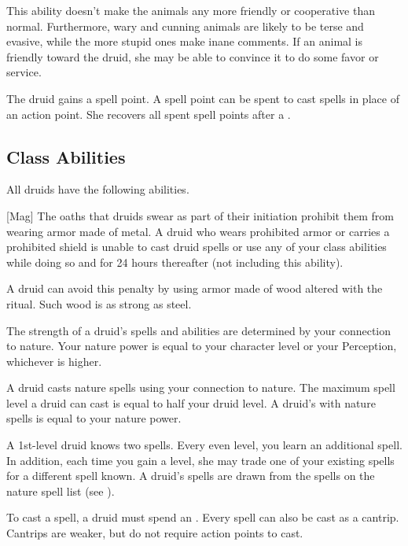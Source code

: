         This ability doesn't make the animals any more friendly or cooperative than normal.
        Furthermore, wary and cunning animals are likely to be terse and evasive, while the more stupid ones make inane comments.
        If an animal is friendly toward the druid, she may be able to convince it to do some favor or service.

        The druid gains a spell point.
        A spell point can be spent to cast spells in place of an action point.
        She recovers all spent spell points after a .

    \subsection{Class Abilities}
        All druids have the following abilities.

        [Mag]
        The oaths that druids swear as part of their initiation prohibit them from wearing armor made of metal.
        A druid who wears prohibited armor or carries a prohibited shield is unable to cast druid spells or use any of your  class abilities while doing so and for 24 hours thereafter (not including this ability).
        
        A druid can avoid this penalty by using armor made of wood altered with the  ritual.
        Such wood is as strong as steel.

        The strength of a druid's spells and abilities are determined by your connection to nature.
        Your nature power is equal to your character level or your Perception, whichever is higher.

        A druid casts nature spells using your connection to nature.
        The maximum spell level a druid can cast is equal to half your druid level.
        A druid's  with nature spells is equal to your nature power.

        A 1st-level druid knows two spells.
        Every even level, you learn an additional spell.
        In addition, each time you gain a level, she may trade one of your existing spells for a different spell known.
        A druid's spells are drawn from the spells on the nature spell list (see ).

        To cast a spell, a druid must spend an .
        Every spell can also be cast as a cantrip.
        Cantrips are weaker, but do not require action points to cast.

